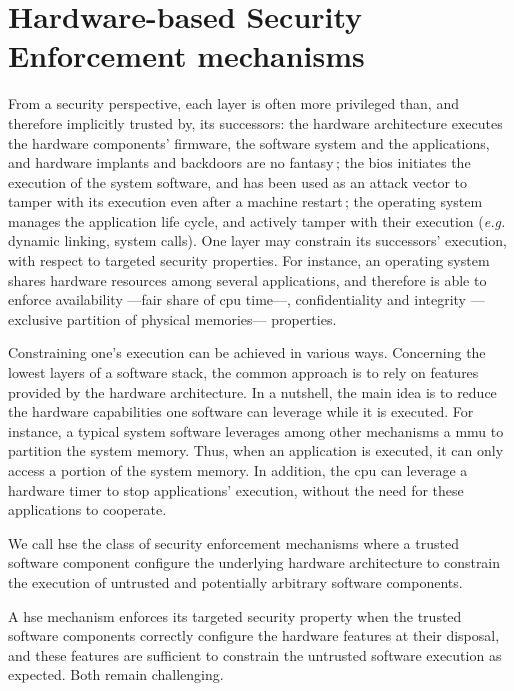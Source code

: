 \section{Hardware-based Security Enforcement mechanisms}

From a security perspective, each layer is often more privileged than, and
therefore implicitly trusted by, its successors:
%
the hardware architecture executes the hardware components' firmware, the
software system and the applications, and hardware implants and backdoors are no
fantasy\,\cite{yang2016a2};
%
the \ac{bios} initiates the execution of the system software, and has been used
as an attack vector to tamper with its execution even after a machine
restart\,\cite{embleton2013smm};
%
the operating system manages the application life cycle, and actively tamper
with their execution (\emph{e.g.} dynamic linking, system calls).
%
One layer may constrain its successors' execution, with respect to targeted
security properties.
%
For instance, an operating system shares hardware resources among several
applications, and therefore is able to enforce availability ---fair share of
\ac{cpu} time---, confidentiality and integrity ---exclusive partition of
physical memories--- properties.

Constraining one's execution can be achieved in various ways.
%
Concerning the lowest layers of a software stack, the common approach is to rely
on features provided by the hardware architecture.
%
In a nutshell, the main idea is to reduce the hardware capabilities one software
can leverage while it is executed.
%
For instance, a typical system software leverages among other mechanisms a
\ac{mmu} to partition the system memory.
%
Thus, when an application is executed, it can only access a portion of the
system memory.
%
In addition, the \ac{cpu} can leverage a hardware timer to stop applications'
execution, without the need for these applications to cooperate.

\begin{definition}
  We call \ac{hse} the class of security enforcement mechanisms where a trusted
  software component configure the underlying hardware architecture to constrain
  the execution of untrusted and potentially arbitrary software components.
\end{definition}

A \ac{hse} mechanism enforces its targeted security property when the trusted
software components correctly configure the hardware features at their disposal,
and these features are sufficient to constrain the untrusted software execution
as expected.
%
Both remain challenging.

